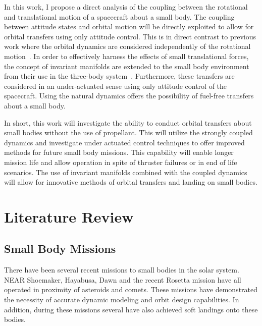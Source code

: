 \documentclass[11pt,draft]{article} %
\begin{document}

In this work, I propose a direct analysis of the coupling between the rotational and translational motion of a spacecraft about a small body. 
The coupling between attitude states and orbital motion will be directly exploited to allow for orbital transfers using only attitude control.
This is in direct contrast to previous work where the orbital dynamics are considered independently of the rotational motion~\cite{kubota2003,antreasian2002}.
In order to effectively harness the effects of small translational forces, the concept of invariant manifolds are extended to the small body environment from their use in the three-body system~\cite{koon2000}. 
Furthermore, these transfers are considered in an under-actuated sense using only attitude control of the spacecraft.
Using the natural dynamics offers the possibility of fuel-free transfers about a small body.

In short, this work will investigate the ability to conduct orbital transfers about small bodies without the use of propellant.
This will utilize the strongly coupled dynamics and investigate under actuated control techniques to offer improved methods for future small body missions.
This capability will enable longer mission life and allow operation in spite of thruster failures or in end of life scenarios.
The use of invariant manifolds combined with the coupled dynamics will allow for innovative methods of orbital transfers and landing on small bodies.

%
%
%
%

\section{Literature Review}
\subsection{Small Body Missions}
There have been several recent missions to small bodies in the solar system.
NEAR Shoemaker, Hayabusa, Dawn and the recent Rosetta mission have all operated in proximity of asteroids and comets.
These missions have demonstrated the necessity of accurate dynamic modeling and orbit design capabilities.
In addition, during these missions several have also achieved soft landings onto these bodies. 
\end{document}
